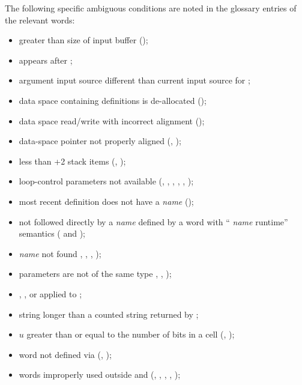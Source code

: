 The following specific ambiguous conditions are noted in the
glossary entries of the relevant words:

\begin{itemize}
\item {} greater than size of input buffer
	();
%
\item {} appears after
	;
%
\item argument input source different than current input source for
	;
%
\item data space containing definitions is de-allocated
	();
%
\item data space read/write with incorrect alignment
	();
%
\item data-space pointer not properly aligned
	(, );
%
\item less than +2 stack items (,
	);
%
\item loop-control parameters not available
	(,
	 ,
	 ,
	 ,
	 ,
	 );
%
\item most recent definition does not have a \emph{name}
	();
%
\item {} not followed directly by a \emph{name}
	defined by a word with `` \emph{name} runtime''
	semantics ( and
	);
%
\item \emph{name} not found ,
	, ,
	);
%
\item parameters are not of the same type ,
	, );
%
\item {},
	,
	 or
	 applied to ;
%
\item string longer than a counted string returned by
	;
%
\item $u$ greater than or equal to the number of bits in a cell
	(, );
%
\item word not defined via 
	(, );
%
\item words improperly used outside
	 and 
	(, ,
	 ,
	 ,
	 );
\end{itemize}

